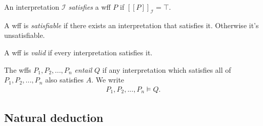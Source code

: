 \documentclass{article}
\begin{document}
\begin{definition}
	An interpretation $\mathcal{I}$ \emph{satisfies} a wff $P$ if $[\![ P]\!]_\mathcal{I}=\top$.
\end{definition}

\begin{definition}
	A wff is \emph{satisfiable} if there exists an interpretation that satisfies it.
	Otherwise it's unsatisfiable.
\end{definition}

\begin{definition}
	A wff is \emph{valid} if every interpretation satisfies it.
\end{definition}

\begin{definition}
	The wffs $P_1, P_2,...,P_n$ \emph{entail} $Q$ if any interpretation
	which satisfies all of $P_1, P_2,...,P_n$ also satisfies $A$.
	We write
	\begin{align*}
		P_1, P_2, ..., P_n \vDash Q.
	\end{align*}
\end{definition}

\subsection{Natural deduction}
\end{document}
